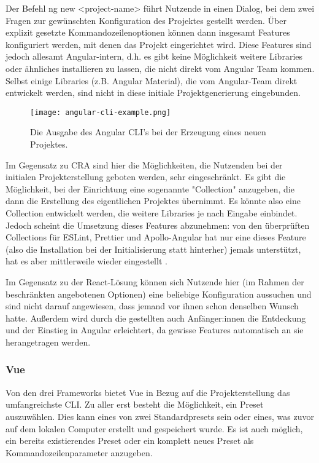 Der Befehl ng new <project-name> führt Nutzende in einen Dialog, bei dem zwei Fragen zur gewünschten Konfiguration des Projektes gestellt werden. Über explizit gesetzte Kommandozeilenoptionen können dann insgesamt Features konfiguriert werden, mit denen das Projekt eingerichtet wird. Diese Features sind jedoch allesamt Angular-intern, d.h. es gibt keine Möglichkeit weitere Libraries oder ähnliches installieren zu lassen, die nicht direkt vom Angular Team kommen. Selbst einige Libraries (z.B. Angular Material), die vom Angular-Team direkt entwickelt werden, sind nicht in diese initiale Projektgenerierung eingebunden.

  \begin{figure}
	\centering
		\texttt{[image: angular-cli-example.png]}
	\caption{Die Ausgabe des Angular CLI's bei der Erzeugung eines neuen Projektes.}
		\label{fig:basics:angular_cli_example}
  \end{figure}

Im Gegensatz zu CRA sind hier die Möglichkeiten, die Nutzenden bei der initialen Projekterstellung geboten werden, sehr eingeschränkt. Es gibt die Möglichkeit, bei der Einrichtung eine sogenannte "Collection" anzugeben, die dann die Erstellung des eigentlichen Projektes übernimmt. Es könnte also eine Collection entwickelt werden, die weitere Libraries je nach Eingabe einbindet. Jedoch scheint die Umsetzung dieses Features abzunehmen: von den überprüften Collections für ESLint, Prettier und Apollo-Angular hat nur eine dieses Feature (also die Installation bei der Initialisierung statt hinterher) jemals unterstützt, hat es aber mittlerweile wieder eingestellt \cite{angular_eslint_collection_issue} \cite{prettier_angular_collection_file} \cite{apollo_angular_collection_file}.

Im Gegensatz zu der React-Lösung können sich Nutzende hier (im Rahmen der beschränkten angebotenen Optionen) eine beliebige Konfiguration aussuchen und sind nicht darauf angewiesen, dass jemand vor ihnen schon denselben Wunsch hatte. Außerdem wird durch die gestellten auch Anfänger:innen die Entdeckung und der Einstieg in Angular erleichtert, da gewisse Features automatisch an sie herangetragen werden.


\subsubsection{Vue}
Von den drei Frameworks bietet Vue in Bezug auf die Projekterstellung das umfangreichste CLI. Zu aller erst besteht die Möglichkeit, ein Preset auszuwählen. Dies kann eines von zwei Standardpresets sein oder eines, was zuvor auf dem lokalen Computer erstellt und gespeichert wurde. Es ist auch möglich, ein bereits existierendes Preset oder ein komplett neues Preset als Kommandozeilenparameter anzugeben.

